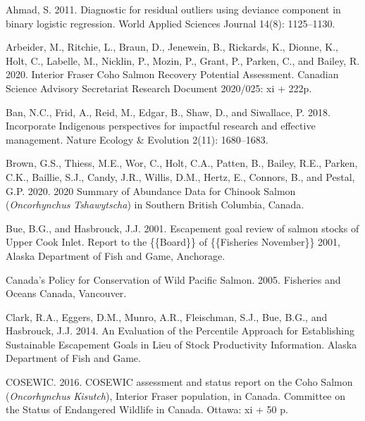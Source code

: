 \documentclass[11pt]{book}
\begin{document}
\hypertarget{refs}{}
\begin{CSLReferences}{1}{0}
%
Ahmad, S. 2011. Diagnostic for residual outliers using deviance component in binary logistic regression. World Applied Sciences Journal 14(8): 1125--1130.

%
Arbeider, M., Ritchie, L., Braun, D., Jenewein, B., Rickards, K., Dionne, K., Holt, C., Labelle, M., Nicklin, P., Mozin, P., Grant, P., Parken, C., and Bailey, R. 2020. Interior {Fraser Coho Salmon Recovery Potential Assessment}. Canadian Science Advisory Secretariat Research Document 2020/025: xi + 222p.

%
Ban, N.C., Frid, A., Reid, M., Edgar, B., Shaw, D., and Siwallace, P. 2018. Incorporate {Indigenous} perspectives for impactful research and effective management. Nature Ecology \& Evolution 2(11): 1680--1683.

%
Brown, G.S., Thiess, M.E., Wor, C., Holt, C.A., Patten, B., Bailey, R.E., Parken, C.K., Baillie, S.J., Candy, J.R., Willis, D.M., Hertz, E., Connors, B., and Pestal, G.P. 2020. 2020 {Summary} of {Abundance Data} for {Chinook Salmon} ({\emph{Oncorhynchus}}{ \emph{Tshawytscha}}) in {Southern British Columbia}, {Canada}.

%
Bue, B.G., and Hasbrouck, J.J. 2001. Escapement goal review of salmon stocks of {Upper Cook Inlet}. Report to the \{\{Board\}\} of \{\{Fisheries November\}\} 2001, {Alaska Department of Fish and Game}, {Anchorage}.

%
Canada's {Policy} for {Conservation} of {Wild Pacific Salmon}. 2005. {Fisheries and Oceans Canada}, {Vancouver}.

%
Clark, R.A., Eggers, D.M., Munro, A.R., Fleischman, S.J., Bue, B.G., and Hasbrouck, J.J. 2014. An {Evaluation} of the {Percentile Approach} for {Establishing Sustainable Escapement Goals} in {Lieu} of {Stock Productivity Information}. {Alaska Department of Fish and Game}.

%
COSEWIC. 2016. {COSEWIC} assessment and status report on the {Coho Salmon} ({\emph{Oncorhynchus}}{ \emph{Kisutch}}), {Interior Fraser} population, in {Canada}. Committee on the Status of Endangered Wildlife in Canada. Ottawa: xi + 50 p.


\end{CSLReferences}
\end{document}

